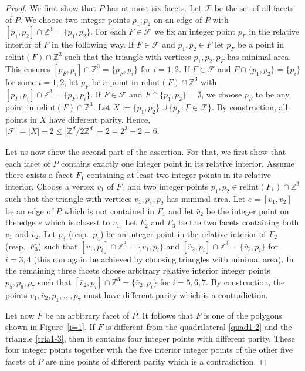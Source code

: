 \documentclass[a4paper]{article}
\theoremstyle{plain}
\begin{document}
\begin{proof}
We first show that $P$ has at most six facets.
Let ${\mathcal{F}}$ be the set of all facets of $P$.
We choose two integer points $p_1,p_2$ on an edge of $P$
with $[p_1,p_2] \cap {\mathbb{Z}}^3 = \{p_1,p_2\}$.
For each $F \in {\mathcal{F}}$ we fix an integer point $p_F$ in the
relative interior of $F$ in the following way.
If $F \in {\mathcal{F}}$ and $p_1,p_2 \in F$ let $p_F$ be a point in
${\mathrm{relint}}(F) \cap {\mathbb{Z}}^3$ such that the triangle with vertices
$p_1,p_2,p_F$ has minimal area.
This ensures $[p_F,p_i] \cap {\mathbb{Z}}^3 = \{p_F,p_i\}$ for $i =
1,2$.
If $F \in {\mathcal{F}}$ and $F \cap \{p_1,p_2\} = \{p_i\}$ for some
$i=1,2$, let $p_F$ be a point in ${\mathrm{relint}}(F) \cap {\mathbb{Z}}^3$
with $[p_F,p_i] \cap {\mathbb{Z}}^3 = \{p_F,p_i\}$.
If $F \in {\mathcal{F}}$ and $F \cap \{p_1,p_2\} = \emptyset$, we
choose $p_F$ to be any point in ${\mathrm{relint}}(F) \cap {\mathbb{Z}}^3$.
Let $X := \{p_1,p_2\} \cup \{p_F: F \in {\mathcal{F}}\}$.
By construction, all points in $X$ have different parity.
Hence, $|{\mathcal{F}}| = |X| - 2 \leq |{\mathbb{Z}}^d / 2 {\mathbb{Z}}^d| - 2 = 2^3 - 2 =6$. 

Let us now show the second part of the assertion.
For that, we first show that each facet of $P$ contains
exactly one integer point in its relative interior.
Assume there exists a facet $F_1$ containing at least two
integer points in its relative interior.
Choose a vertex $v_1$ of $F_1$ and two integer points
$p_1,p_2 \in {\mathrm{relint}}(F_1) \cap {\mathbb{Z}}^3$ such that the triangle
with vertices $v_1,p_1,p_2$ has minimal area.
Let $e = [v_1,v_2]$ be an edge of $P$ which is not contained
in $F_1$ and let $\bar{v}_2$ be the integer point on the
edge $e$ which is closest to $v_1$.
Let $F_2$ and $F_3$ be the two facets containing both $v_1$
and $\bar{v}_2$.
Let $p_3$ (resp.~$p_4$) be an integer point in the relative
interior of $F_2$ (resp.~$F_3$) such that $[v_1,p_i] \cap
{\mathbb{Z}}^3 = \{v_1,p_i\}$ and $[\bar{v}_2,p_i] \cap {\mathbb{Z}}^3 =
\{\bar{v}_2,p_i\}$ for $i = 3,4$ (this can again be achieved
by choosing triangles with minimal area).
In the remaining three facets choose arbitrary relative
interior integer points $p_5, p_6, p_7$ such that
$[\bar{v}_2,p_i] \cap {\mathbb{Z}}^3 = \{\bar{v}_2,p_i\}$ for $i =
5,6,7$.
By construction, the points $v_1, \bar{v}_2, p_1, \dots,
p_7$ must have different parity which is a contradiction.

Let now $F$ be an arbitrary facet of $P$.
It follows that $F$ is one of the polygons shown in
Figure~\ref{i=1}.
If $F$ is different from the quadrilateral \ref{quad1-2} and
the triangle \ref{tria1-3}, then it contains four integer
points with different parity.
These four integer points together with the five interior
integer points of the other five facets of $P$ are nine
points of different parity which is a contradiction.
\end{proof}
\end{document}
